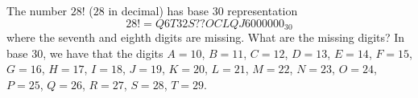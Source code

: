 The number $28!$ ($28$ in decimal) has base $30$ representation \[28!=Q6T32S??OCLQJ6000000_{30}\] where the seventh and eighth digits are missing. What are the missing digits? In base $30$, we have that the digits $A=10$, $B=11$, $C=12$, $D=13$, $E=14$, $F=15$, $G=16$, $H=17$, $I=18$, $J=19$, $K=20$, $L=21$, $M=22$, $N=23$, $O=24$, $P=25$, $Q=26$, $R=27$, $S=28$, $T=29$.